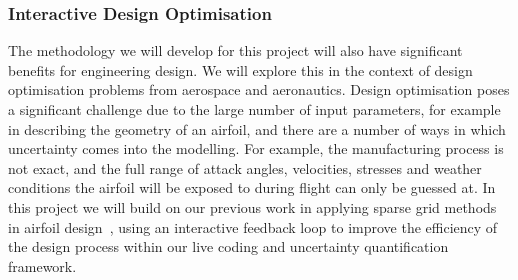 \subsubsection*{Interactive Design Optimisation}

The methodology we will develop for this project will also have
significant benefits for engineering design. We will explore this in
the context of design optimisation problems from aerospace and
aeronautics. Design optimisation poses a significant challenge due to
the large number of input parameters, for example in describing the
geometry of an airfoil, and there are a number of ways in which
uncertainty comes into the modelling. For example, the manufacturing
process is not exact, and the full range of attack angles, velocities,
stresses and weather conditions the airfoil will be exposed to during
flight can only be guessed at. In this project we will build on our
previous work in applying sparse grid methods in airfoil
design~\parencite{SU2,deBaarHarding2015}, using an interactive
feedback loop to improve the efficiency of the design process within
our live coding and uncertainty quantification framework.


